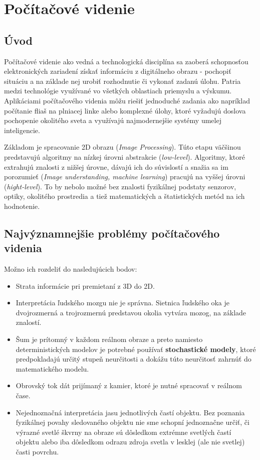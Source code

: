 \renewcommand{\theequation}{\thesection{}}



\chapter{Počítačové videnie}
\section{Úvod}

Počítačové videnie ako vedná a technologická disciplína sa zaoberá schopnosťou elektronických zariadení získať informáciu z digitálneho obrazu - pochopiť situáciu a na základe nej urobiť rozhodnutie či vykonať zadanú úlohu. Patria medzi technológie využívané vo všetkých oblastiach priemyslu a výskumu. Aplikáciami počítačového videnia môžu riešiť jednoduché zadania ako napríklad počítanie fliaš na plniacej linke alebo komplexné úlohy, ktoré vyžadujú doslova pochopenie okolitého sveta a využívajú najmodernejšie systémy umelej inteligencie. \cite{pocitacove_videnie_v_praxi}

Základom je spracovanie 2D obrazu (\textit{Image Processing}). Túto etapu väčšinou predstavujú algoritmy na nízkej úrovni abstrakcie (\textit{low-level}). Algoritmy, ktoré extrahujú znalosti z nižšej úrovne, dávajú ich do súvislostí a snažia sa im porozumieť (\textit{Image understanding, machine learning}) pracujú na vyššej úrovni (\textit{hight-level}). To by nebolo možné bez znalosti fyzikálnej podstaty senzorov, optiky, okolitého prostredia a tiež matematických a štatistických metód na ich hodnotenie. \cite{pocitacove_videnie_v_praxi} 


\section{Najvýznamnejšie problémy počítačového videnia }
Možno ich rozdeliť do nasledujúcich bodov: \cite{Analysis_and_Machine_Vision}
\begin{itemize}
\item Strata informácie pri premietaní z 3D do 2D. 
\item Interpretácia ľudského mozgu nie je správna. Sietnica ľudského oka je dvojrozmerná a trojrozmernú predstavou okolia vytvára mozog, na základe znalostí.
\item Šum je prítomný v každom reálnom obraze a preto namiesto deterministických modelov je potrebné používať \textbf{stochastické modely}, ktoré predpokladajú určitý stupeň neurčitosti a dokážu túto neurčitosť zahrnúť do matematického modelu.
\item Obrovský tok dát prijímaný z kamier, ktoré je nutné spracovať v reálnom čase.
\item Nejednoznačná interpretácia jasu jednotlivých častí objektu. Bez poznania fyzikálnej povahy sledovaného objektu nie sme schopní jednoznačne určiť, či výrazné svetlé škvrny na obraze sú dôsledkom extrémne svetlých častí objektu alebo iba dôsledkom odrazu zdroja svetla v lesklej (ale nie svetlej) časti povrchu.
\end{itemize}



